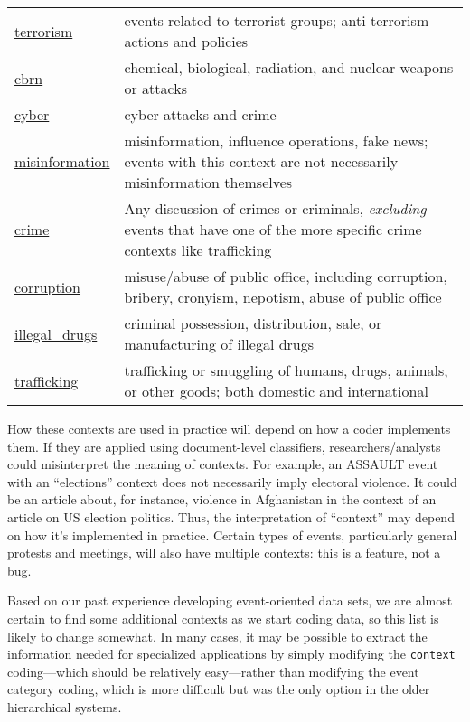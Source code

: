 \documentclass[11pt]{report}
\newcommand{\plcat}[1]{\textsf{#1}}
\newcommand{\txt}[1]{\texttt{#1}}
\begin{document}
\begin{longtable}{|p{}|L{.73\textwidth}|}
\hyperref[context:terrorism]{terrorism} & events related to terrorist groups; anti-terrorism actions and policies \\
\hyperref[context:cbrn]{cbrn} & chemical, biological, radiation, and nuclear weapons or attacks  \\
\hyperref[context:cyber]{cyber} & cyber attacks and crime\\
\hyperref[context:misinfo]{misinformation} & misinformation, influence operations, fake news; events with this context are not necessarily misinformation themselves\\
\hyperref[context:crime]{crime} & Any discussion of crimes or criminals, \textit{excluding} events that have one of the more specific crime contexts like trafficking \\
\hyperref[context:corruption]{corruption} &  misuse/abuse of public office, including corruption, bribery, cronyism, nepotism, abuse of public office  \\
\hyperref[context:drugs]{illegal\_drugs} & criminal possession, distribution, sale, or manufacturing of illegal drugs \\
\hyperref[context:trafficking]{trafficking} & trafficking or smuggling of humans, drugs, animals, or other goods; both domestic and international \\
\end{longtable}


How these contexts are used in practice will depend on how a coder implements them. If they are applied using document-level classifiers, researchers/analysts could misinterpret the meaning of contexts. For example, an \plcat{ASSAULT} event with an ``elections'' context does not necessarily imply electoral violence. It could be an article about, for instance, violence in Afghanistan in the context of an article on US election politics. Thus, the interpretation of ``context'' may depend on how it's implemented in practice. Certain types of events, particularly general protests and meetings, will also have multiple contexts: this is a feature, not a bug.

Based on our past experience developing event-oriented data sets, we are almost certain to find some additional contexts as we start coding data, so this list is likely to change somewhat.  In many cases, it may be possible to extract the information needed for specialized applications by simply modifying the \txt{context} coding---which should be relatively easy---rather than modifying the event category coding, which is more difficult but was the only option in the older hierarchical systems.
\end{document}
